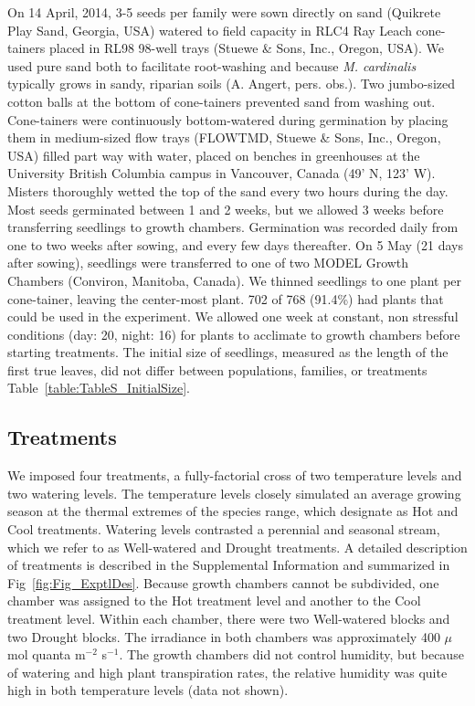 \documentclass[11pt, oneside]{article}
\begin{document}
On 14 April, 2014, 3-5 seeds per family were sown directly on sand (Quikrete Play Sand, Georgia, USA) watered to field capacity in RLC4 Ray Leach cone-tainers placed in RL98 98-well trays (Stuewe \& Sons, Inc., Oregon, USA). We used pure sand both to facilitate root-washing and because \textit{M. cardinalis} typically grows in sandy, riparian soils (A. Angert, pers. obs.). Two jumbo-sized cotton balls at the bottom of cone-tainers prevented sand from washing out. Cone-tainers were continuously bottom-watered during germination by placing them in medium-sized flow trays (FLOWTMD, Stuewe \& Sons, Inc., Oregon, USA) filled part way with water, placed on benches in greenhouses at the University British Columbia campus in Vancouver, Canada (49' N, 123' W). Misters thoroughly wetted the top of the sand every two hours during the day. Most seeds germinated between 1 and 2 weeks, but we allowed 3 weeks before transferring seedlings to growth chambers. Germination was recorded daily from one to two weeks after sowing, and every few days thereafter. On 5 May (21 days after sowing), seedlings were transferred to one of two MODEL Growth Chambers (Conviron, Manitoba, Canada). We thinned seedlings to one plant per cone-tainer, leaving the center-most plant. 702 of 768 (91.4\%) had plants that could be used in the experiment. We allowed one week at constant, non stressful conditions (day: 20\celsius, night: 16\celsius) for plants to acclimate to growth chambers before starting treatments. The initial size of seedlings, measured as the length of the first true leaves, did not differ between populations, families, or treatments Table~\ref{table:TableS_InitialSize}.
    
\subsection*{Treatments}

We imposed four treatments, a fully-factorial cross of two temperature levels and two watering levels. The temperature levels closely simulated an average growing season at the thermal extremes of the species range, which designate as Hot and Cool treatments. Watering levels contrasted a perennial and seasonal stream, which we refer to as Well-watered and Drought treatments. A detailed description of treatments is described in the Supplemental Information and summarized in Fig~\ref{fig:Fig_ExptlDes}. Because growth chambers cannot be subdivided, one chamber was assigned to the Hot treatment level and another to the Cool treatment level. Within each chamber, there were two Well-watered blocks and two Drought blocks.  The irradiance in both chambers was approximately 400 $\mu$mol quanta m$^{-2}$ s$^{-1}$. The growth chambers did not control humidity, but because of watering and high plant transpiration rates, the relative humidity was quite high in both temperature levels (data not shown). 
\end{document}
